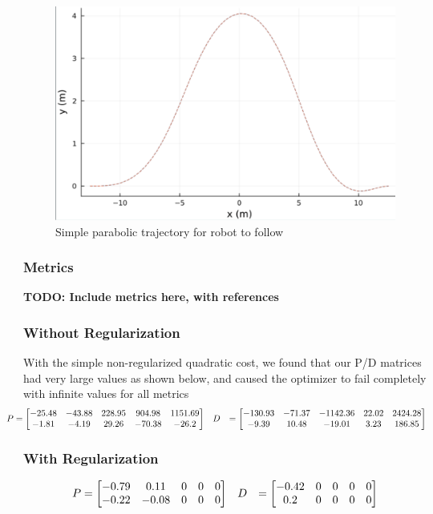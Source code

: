 \documentclass[11pt]{article}
\begin{document}
    \begin{figure}[h!]
        \centering
        \includegraphics[width=0.5\linewidth]{trajectory}
        \caption{Simple parabolic trajectory for robot to follow}
        \label{fig:trajectory}
    \end{figure}

    \subsubsection{Metrics} \label{sec:results:metrics}
    \textbf{TODO: Include metrics here, with references}

    \subsubsection{Without Regularization} \label{sec:results:singletraj:noreg}
    With the simple non-regularized quadratic cost, we found that our P/D matrices had very large values as shown below, and caused the optimizer to fail completely with infinite values for all metrics
        \begin{align*}
            \hspace{-2em}
            P &= \bmat{-25.48 & -43.88 & 228.95 & 904.98 & 1151.69 \\
                -1.81 & -4.19 & 29.26 & -70.38 & -26.2} && 
            D &
            = \bmat{-130.93 & -71.37 & -1142.36 & 22.02 & 2424.28 \\
                -9.39 & 10.48  & -19.01 & 3.23 & 186.85}
        \end{align*}
    
    \subsubsection{With Regularization} \label{sec:results:singletraj:wreg}
        \begin{align*}
            P &= \begin{bmatrix}-0.79 & 0.11 & 0 & 0 & 0 \\ -0.22 & -0.08 & 0 & 0 & 0\end{bmatrix} && 
            D &= \begin{bmatrix}-0.42 & 0 & 0 & 0 & 0 \\  0.2 & 0 & 0 & 0 & 0\end{bmatrix}
        \end{align*}
    
\end{document}
